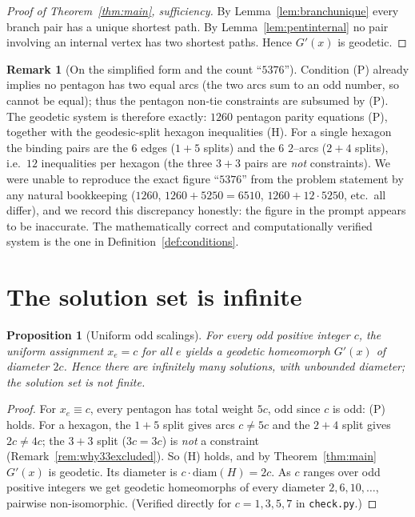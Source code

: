 \documentclass{amsart}
\newtheorem{proposition}{Proposition}
\theoremstyle{definition}
\newtheorem{remark}{Remark}
\begin{document}
\begin{proof}[Proof of Theorem~\ref{thm:main}, sufficiency]
By Lemma~\ref{lem:branchunique} every branch pair has a unique shortest path. By
Lemma~\ref{lem:pentinternal} no pair involving an internal vertex has two
shortest paths. Hence $G'(x)$ is geodetic.
\end{proof}

\begin{remark}[On the simplified form and the count ``$5376$'']\label{rem:simpl}
Condition (P) already implies no pentagon has two equal arcs (the two arcs sum to
an odd number, so cannot be equal); thus the pentagon non-tie constraints are
subsumed by (P). The geodetic system is therefore exactly: $1260$ pentagon
parity equations (P), together with the geodesic-split hexagon inequalities (H).
For a single hexagon the binding pairs are the $6$ edges ($1{+}5$ splits) and the
$6$ $2$--arcs ($2{+}4$ splits), i.e.\ $12$ inequalities per hexagon (the three
$3{+}3$ pairs are \emph{not} constraints). We were unable to reproduce the exact
figure ``$5376$'' from the problem statement by any natural bookkeeping
($1260$, $1260+5250=6510$, $1260+12\cdot5250$, etc.\ all differ), and we record
this discrepancy honestly: the figure in the prompt appears to be inaccurate.
The mathematically correct and computationally verified system is the one in
Definition~\ref{def:conditions}.
\end{remark}

\section{The solution set is infinite}

\begin{proposition}[Uniform odd scalings]\label{prop:infinite}
For every odd positive integer $c$, the uniform assignment $x_e=c$ for all $e$
yields a geodetic homeomorph $G'(x)$ of diameter $2c$. Hence there are infinitely
many solutions, with unbounded diameter; the solution set is not finite.
\end{proposition}

\begin{proof}
For $x_e\equiv c$, every pentagon has total weight $5c$, odd since $c$ is odd:
(P) holds. For a hexagon, the $1{+}5$ split gives arcs $c\ne5c$ and the $2{+}4$
split gives $2c\ne4c$; the $3{+}3$ split ($3c=3c$) is \emph{not} a constraint
(Remark~\ref{rem:why33excluded}). So (H) holds, and by Theorem~\ref{thm:main}
$G'(x)$ is geodetic. Its diameter is $c\cdot\mathrm{diam}(H)=2c$. As $c$ ranges
over odd positive integers we get geodetic homeomorphs of every diameter
$2,6,10,\dots$, pairwise non-isomorphic. (Verified directly for $c=1,3,5,7$ in
\texttt{check.py}.)
\end{proof}
\end{document}
